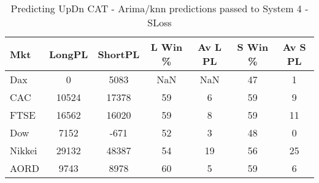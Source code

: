 \begin{table}[ht]
\centering
\caption[Predicting UpDn CAT - Arima/knn predictions passed to System 4 - SLoss]{Predicting UpDn CAT - Arima/knn predictions passed to System 4 - SLoss} 
\label{tab:chp_ts:pUD_CAT_arima_knn_sys_SL}
\begin{tabular}{lcccccc}
  \toprule Mkt & LongPL & ShortPL & L Win \% & Av L PL & S Win \% & Av S PL \\ 
  \midrule Dax & 0 & 5083 & NaN & NaN & 47 & 1 \\ 
  CAC & 10524 & 17378 & 59 & 6 & 59 & 9 \\ 
  FTSE & 16562 & 16020 & 59 & 8 & 59 & 11 \\ 
  Dow & 7152 & -671 & 52 & 3 & 48 & 0 \\ 
  Nikkei & 29132 & 48387 & 54 & 19 & 56 & 25 \\ 
  AORD & 9743 & 8978 & 60 & 5 & 59 & 6 \\ 
   \bottomrule \end{tabular}
\end{table}
